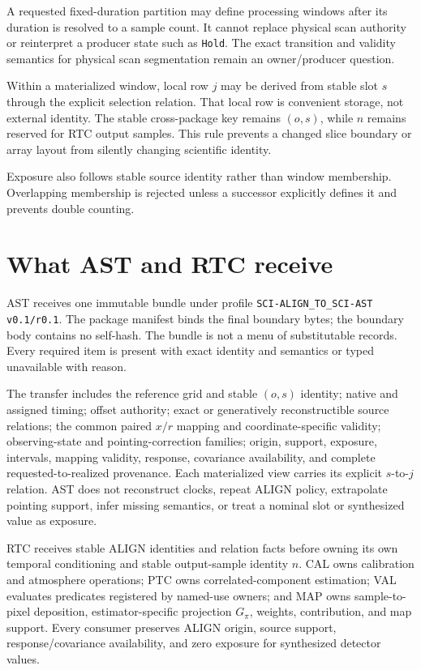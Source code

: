 \documentclass[10pt]{article}
\newcommand{\code}[1]{\nolinkurl{#1}}
\begin{document}
A requested fixed-duration partition may define processing windows after its
duration is resolved to a sample count.  It cannot replace physical scan
authority or reinterpret a producer state such as \code{Hold}.  The exact
transition and validity semantics for physical scan segmentation remain an
owner/producer question.

Within a materialized window, local row \(j\) may be derived from stable slot
\(s\) through the explicit selection relation.  That local row is convenient
storage, not external identity.  The stable cross-package key remains
\((o,s)\), while \(n\) remains reserved for RTC output samples.  This rule
prevents a changed slice boundary or array layout from silently changing
scientific identity.

Exposure also follows stable source identity rather than window membership.
Overlapping membership is rejected unless a successor explicitly defines it
and prevents double counting.

\clearpage
\section{What AST and RTC receive}

AST receives one immutable bundle under profile
\code{SCI-ALIGN_TO_SCI-AST v0.1/r0.1}.  The package manifest binds the final
boundary bytes; the boundary body contains no self-hash.  The bundle is not a
menu of substitutable records.  Every required item is present with exact
identity and semantics or typed unavailable with reason.

The transfer includes the reference grid and stable \((o,s)\) identity;
native and assigned timing; offset authority; exact or generatively
reconstructible source relations; the common paired \(x/r\) mapping and
coordinate-specific validity; observing-state and pointing-correction
families; origin, support, exposure, intervals, mapping validity, response,
covariance availability, and complete requested-to-realized provenance.  Each
materialized view carries its explicit \(s\)-to-\(j\) relation.  AST does not
reconstruct clocks, repeat ALIGN policy, extrapolate pointing support, infer
missing semantics, or treat a nominal slot or synthesized value as exposure.

RTC receives stable ALIGN identities and relation facts before owning its own
temporal conditioning and stable output-sample identity \(n\).  CAL owns
calibration and atmosphere operations; PTC owns correlated-component
estimation; VAL evaluates predicates registered by named-use owners; and MAP
owns sample-to-pixel deposition, estimator-specific projection \(G_\pi\),
weights, contribution, and map support.  Every consumer preserves ALIGN
origin, source support, response/covariance availability, and zero exposure
for synthesized detector values.
\end{document}
